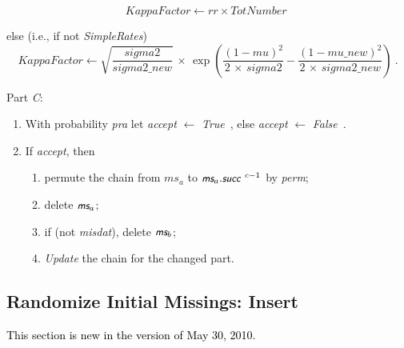 \documentclass[a4paper,12pt,fleqn]{article}
\newcommand{\ttimes}{\,\times\,}
\newcommand{\nnm}[1]{\textsf{\small\textit{#1}\ }}
\newcommand{\ms}{\textsl{\textsf{\small ms}}} %
\newcommand{\addcf}[1]{{\textcolor[named]{Black}{#1}}}
\begin{document}
\begin{enumerate}[resume]
{\begin{enumerate}
\begin{equation}
        \textit{KappaFactor} \leftarrow rr \times \textit{TotNumber }  \nonumber
        \end{equation}
      \end{enumerate}
}
      else (i.e., if not \textit{SimpleRates})
      \begin{equation}
      \textit{KappaFactor} \leftarrow \sqrt{ \frac{\textit{sigma2}}{\textit{sigma2\_new}} }
                  \ttimes \exp\left( \frac{\left(1 - \textit{mu} \right)^2}{2\ttimes\textit{sigma2}}
                   - \frac{\left(1 - \textit{mu\_new} \right)^2}{2\ttimes\textit{sigma2\_new}}  \right) \ .
      \end{equation}

\end{enumerate}

Part \emph{C}:
\begin{enumerate}[resume]
\item With probability \textit{pra} let \textit{accept} $\leftarrow$ \nnm{True}, else
      \textit{accept} $\leftarrow$ \nnm{False}.
\item If \textit{accept}, then
       \begin{enumerate}
       \item permute the chain from $ms_a$ to $\ms_a.\nnm{succ}^{c-1}$ by \textit{perm};
       \item delete $\ms_a$;
       \item if (not \textit{misdat}), delete $\ms_b$;
       \item  \textit{Update} the chain for the changed part.
       \end{enumerate}
\end{enumerate}

\subsection{Randomize Initial Missings: Insert}
\label{S_RMI}
\addcf{This section is new in the version of May 30, 2010.}
\end{document}

